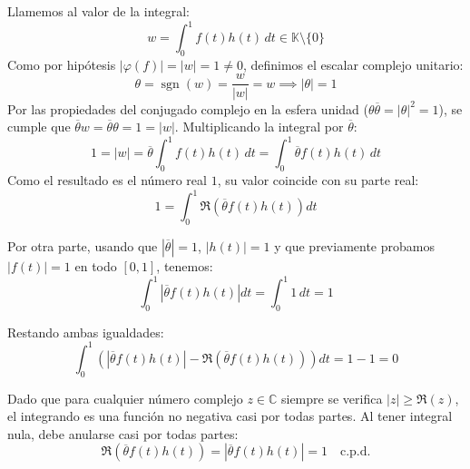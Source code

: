 \documentclass[12pt]{article}
\begin{document}
\begin{ejercicio}
\begin{description}
\begin{itemize}
                Llamemos al valor de la integral:
                \begin{equation*}
                    w = \int_0^1 f(t) h(t)\,dt \in \mathbb{K}\setminus \{0\}
                \end{equation*}
                Como por hipótesis $|\varphi(f)| = |w| = 1 \neq 0$, definimos el escalar complejo unitario:
                \begin{equation*}
                    \theta = \operatorname{sgn}(w) = \frac{w}{|w|} = w \implies |\theta| = 1
                \end{equation*}
                Por las propiedades del conjugado complejo en la esfera unidad ($\theta \overline{\theta} = |\theta|^2 = 1$), se cumple que $\overline{\theta} w = \overline{\theta} \theta = 1 = |w|$. Multiplicando la integral por $\overline{\theta}$:
                \begin{equation*}
                    1 = |w| = \overline{\theta} \int_0^1 f(t) h(t)\,dt = \int_0^1 \overline{\theta} f(t) h(t)\,dt
                \end{equation*}
                Como el resultado es el número real $1$, su valor coincide con su parte real:
                \begin{equation*}
                    1 = \int_0^1 \Re\left( \overline{\theta} f(t) h(t) \right) dt
                \end{equation*}

                Por otra parte, usando que $|\overline{\theta}| = 1$, $|h(t)| = 1$ y que previamente probamos $|f(t)| = 1$ en todo $[0, 1]$, tenemos:
                \begin{equation*}
                    \int_0^1 \left| \overline{\theta} f(t) h(t) \right| dt = \int_0^1 1\,dt = 1
                \end{equation*}

                Restando ambas igualdades:
                \begin{equation*}
                    \int_0^1 \left( \left| \overline{\theta} f(t) h(t) \right| - \Re\left( \overline{\theta} f(t) h(t) \right) \right) dt = 1 - 1 = 0
                \end{equation*}

                Dado que para cualquier número complejo $z \in \mathbb{C}$ siempre se verifica $|z| \geq \Re(z)$, el integrando es una función no negativa casi por todas partes. Al tener integral nula, debe anularse casi por todas partes:
                \begin{equation*}
                    \Re\left( \overline{\theta} f(t) h(t) \right) = \left| \overline{\theta} f(t) h(t) \right| = 1 \quad \text{c.p.d.}
                \end{equation*}


\end{itemize}
\end{description}
\end{ejercicio}
\end{document}
